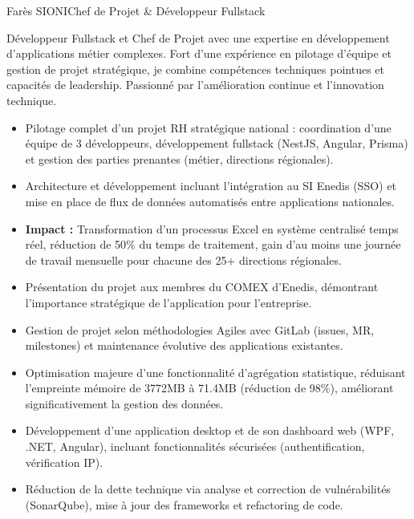 \documentclass[a4paper,11pt]{article}
\begin{document}
\begin{cv}[profile][2]
{Farès SIONI}{Chef de Projet \& Développeur Fullstack}

Développeur Fullstack et Chef de Projet avec une expertise en développement d'applications métier complexes.
Fort d'une expérience en pilotage d'équipe et gestion de projet stratégique, je combine compétences techniques pointues et capacités de leadership.
Passionné par l'amélioration continue et l'innovation technique.

    \begin{cvevent}[08/2023][08/2025]
        \begin{itemize}
            \item Pilotage complet d'un projet RH stratégique national : coordination d'une équipe de 3 développeurs, développement fullstack (NestJS, Angular, Prisma) et gestion des parties prenantes (métier, directions régionales).
            \item Architecture et développement incluant l'intégration au SI Enedis (SSO) et mise en place de flux de données automatisés entre applications nationales.
            \item \textbf{Impact :} Transformation d'un processus Excel en système centralisé temps réel, réduction de 50\% du temps de traitement, gain d'au moins une journée de travail mensuelle pour chacune des 25+ directions régionales.
            \item Présentation du projet aux membres du COMEX d'Enedis, démontrant l'importance stratégique de l'application pour l'entreprise.
            \item Gestion de projet selon méthodologies Agiles avec GitLab (issues, MR, milestones) et maintenance évolutive des applications existantes.
        \end{itemize}
    \end{cvevent}

\cvseparator[2]
    \begin{cvevent}[06/2023][08/2023]
        \begin{itemize}
            \item Optimisation majeure d'une fonctionnalité d'agrégation statistique, réduisant l'empreinte mémoire de 3772MB à 71.4MB (réduction de 98\%), améliorant significativement la gestion des données.
            \item Développement d'une application desktop et de son dashboard web (WPF, .NET, Angular), incluant fonctionnalités sécurisées (authentification, vérification IP).
            \item Réduction de la dette technique via analyse et correction de vulnérabilités (SonarQube), mise à jour des frameworks et refactoring de code.
        \end{itemize}
    \end{cvevent}


\end{cv}
\end{document}
